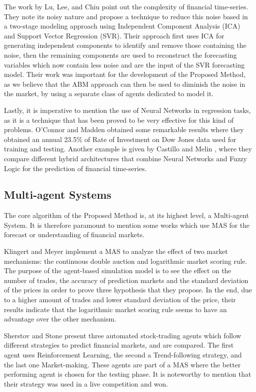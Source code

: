 The work by Lu, Lee, and Chiu \cite{Lu2009} point out the complexity of financial time-series. They note its noisy nature and propose a technique to reduce this noise based in a two-stage modeling approach using Independent Component Analysis (ICA) and Support Vector Regression (SVR). Their approach first uses ICA for generating independent components to identify and remove those containing the noise, then the remaining components are used to reconstruct the forecasting variables which now contain less noise and are the input of the SVR forecasting model. Their work was important for the development of the Proposed Method, as we believe that the ABM approach can then be used to diminish the noise in the market, by using a separate class of agents dedicated to model it.

Lastly, it is imperative to mention the use of Neural Networks in regression tasks, as it is a technique that has been proved to be very effective for this kind of problems. O'Connor and Madden \cite{Connor2005} obtained some remarkable results where they obtained an annual 23.5\% of Rate of Investment on Dow Jones data used for training and testing. Another example is given by Castillo and Melin \cite{castillo2001simulation}, where they compare different hybrid architectures that combine Neural Networks and Fuzzy Logic for the prediction of financial time-series.

\subsection{Multi-agent Systems}
\label{multi-agent-systems}

The core algorithm of the Proposed Method is, at its highest level, a Multi-agent System. It is therefore paramount to mention some works which use MAS for the forecast or understanding of financial markets.

Klingert and Meyer \cite{Klingert_2012} implement a MAS to analyze the effect of two market mechanisms: the continuous double auction and logarithmic market scoring rule. The purpose of the agent-based simulation model is to see the effect on the number of trades, the accuracy of prediction markets and the standard deviation of the prices in order to prove three hypothesis that they propose. In the end, due to a higher amount of trades and lower standard deviation of the price, their results indicate that the logarithmic market scoring rule seems to have an advantage over the other mechanism.

Sherstov and Stone \cite{Sherstov2005} present three automated stock-trading agents which follow different strategies to predict financial markets, and are compared. The first agent uses Reinforcement Learning, the second a Trend-following strategy, and the last one Market-making. These agents are part of a MAS where the better performing agent is chosen for the testing phase. It is noteworthy to mention that their strategy was used in a live competition and won.

